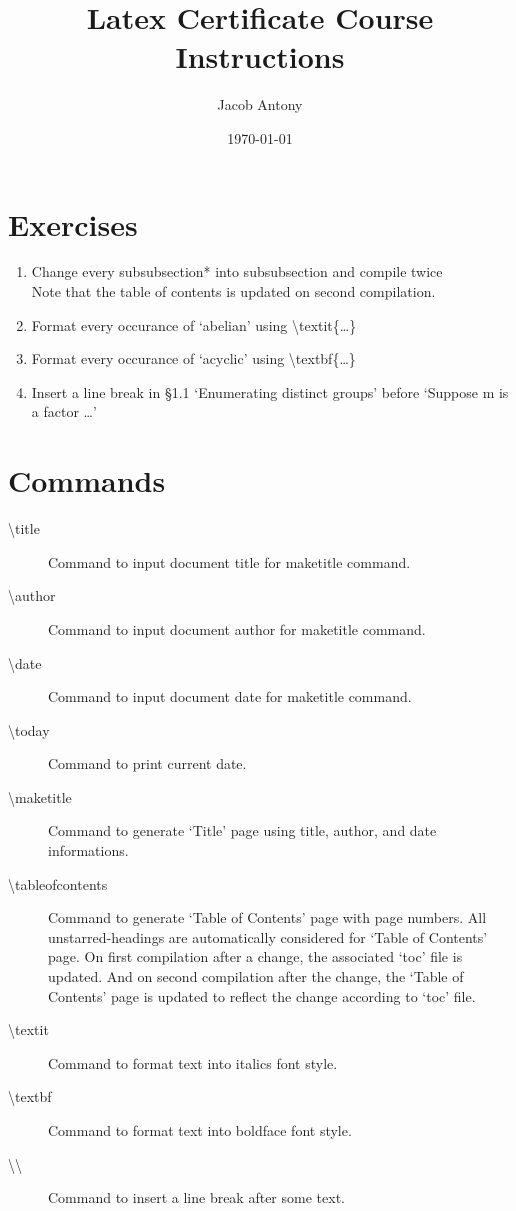 \documentclass{article}
\title{Latex Certificate Course Instructions}
\author{Jacob Antony}
\date{\today}
\begin{document}
\maketitle

\section{Exercises}
\begin{enumerate}
	\item Change every subsubsection* into subsubsection and compile twice\\
		Note that the table of contents is updated on second compilation. 
	\item Format every occurance of `abelian' using \textbackslash textit\{\dots\}
	\item Format every occurance of `acyclic' using \textbackslash textbf\{\dots\}
	\item Insert a line break in \S1.1 `Enumerating distinct groups' before `Suppose m is a factor \dots'
\end{enumerate}

\section{Commands}
\begin{description}
	\item[\textbackslash title] Command to input document title for maketitle command.
	\item[\textbackslash author] Command to input document author for maketitle command.
	\item[\textbackslash date] Command to input document date for maketitle command.
	\item[\textbackslash today] Command to print current date.
	\item[\textbackslash maketitle] Command to generate `Title' page using title, author, and date informations.
	\item[\textbackslash tableofcontents] Command to generate `Table of Contents' page with page numbers. All unstarred-headings are automatically considered for `Table of Contents' page. On first compilation after a change, the associated `toc' file is updated. And on second compilation after the change, the `Table of Contents' page is updated to reflect the change according to `toc' file.
	\item[\textbackslash textit] Command to format text into italics font style.
	\item[\textbackslash textbf] Command to format text into boldface font style. 
	\item[\textbackslash \textbackslash] Command to insert a line break after some text.
\end{description}
 
\end{document}

